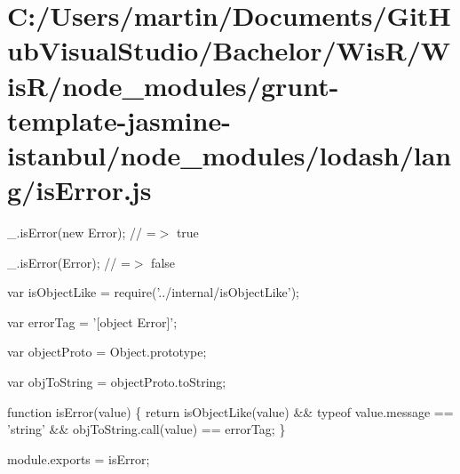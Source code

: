 \hypertarget{_c_1_2_users_2martin_2_documents_2_git_hub_visual_studio_2_bachelor_2_wis_r_2_wis_r_2node_modulefca44f4ef3c7065d3c0815793f82533a}{}\section{C\+:/\+Users/martin/\+Documents/\+Git\+Hub\+Visual\+Studio/\+Bachelor/\+Wis\+R/\+Wis\+R/node\+\_\+modules/grunt-\/template-\/jasmine-\/istanbul/node\+\_\+modules/lodash/lang/is\+Error.\+js}
\+\_\+.\+is\+Error(new Error); // =$>$ true

\+\_\+.\+is\+Error(\+Error); // =$>$ false


\begin{DoxyCodeInclude}
var isObjectLike = require(\textcolor{stringliteral}{'../internal/isObjectLike'});

var errorTag = \textcolor{stringliteral}{'[object Error]'};

var objectProto = Object.prototype;

var objToString = objectProto.toString;

\textcolor{keyword}{function} isError(value) \{
  \textcolor{keywordflow}{return} isObjectLike(value) && typeof value.message == \textcolor{stringliteral}{'string'} && objToString.call(value) == errorTag;
\}

module.exports = isError;
\end{DoxyCodeInclude}
 